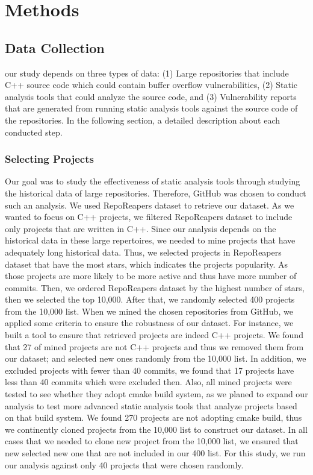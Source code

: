 \section{Methods}
\subsection{Data Collection}
our study depends on three types of data: (1) Large repositories that include C++ source code which could contain buffer overflow vulnerabilities, (2) Static analysis tools that could analyze the source code, and (3) Vulnerability reports that are generated from running static analysis tools against the source code of the repositories. In the following section, a detailed description about each conducted step.
\newline
\subsubsection{\textbf{Selecting Projects}}
Our goal was to study the effectiveness of static analysis tools through studying the historical data of large repositories. Therefore, GitHub was chosen to conduct such an analysis. We used RepoReapers dataset \cite{Reporeapers2016} to retrieve our dataset. As we wanted to focus on C++ projects, we filtered RepoReapers dataset to include only projects that are written in C++. Since our analysis depends on the historical data in these large repertoires, we needed to mine projects that have adequately long historical data. Thus, we selected projects in RepoReapers dataset that have the most stars, which indicates the projects popularity. As those projects are more likely to be more active and thus have more number of commits. Then, we ordered RepoReapers dataset by the highest number of stars, then we selected the top 10,000. After that, we randomly selected 400 projects from the 10,000 list. When we mined the chosen repositories from GitHub, we applied some criteria to ensure the robustness of our dataset. For instance, we built a tool to ensure that retrieved projects are indeed C++ projects. We found that 27 of mined projects are not C++ projects and thus we removed them from our dataset; and selected new ones randomly from the 10,000 list. In addition, we excluded projects with fewer than 40 commits, we found that 17 projects have less than 40 commits which were excluded then. Also, all mined projects were tested to see whether they adopt cmake build system, as we planed to expand our analysis to test more advanced static analysis tools that analyze projects based on that build system. We found 270 projects are not adopting cmake build, thus we continently cloned projects from the 10,000 list to construct our dataset. In all cases that we needed to clone new project from the 10,000 list, we ensured that new selected new one that are not included in our 400 list. For this study, we run our analysis against only 40 projects that were chosen randomly.
\newline

